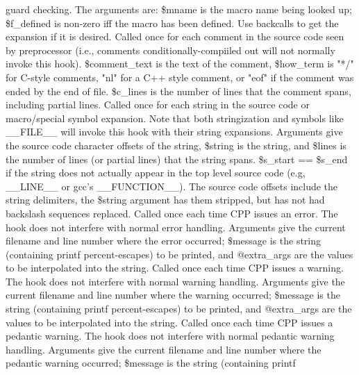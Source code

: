 guard checking.  The arguments are:
\$mname is the macro name being looked up; \$f\_\-defined is non-zero
iff the macro has been defined.  Use backcalls to get the expansion if
it is desired.
Called once for each comment in the source code seen by preprocessor (i.e.,
comments conditionally-compiiled out will not normally invoke this hook).
\$comment\_\-text is the text of the comment, \$how\_\-term is "*/" for C-style
comments, "nl" for a C++ style comment, or "eof" if the comment
was ended by the end of file.
\$c\_\-lines is the number of lines that the comment spans, including partial lines.
Called once for each string in the source code or macro/special symbol expansion.
Note that both stringization and symbols like \_\-\_\-FILE\_\-\_\- will invoke this hook
with their string expansions.
Arguments give the source code character offsets of the string, \$string is
the string, and \$lines is the number of lines (or partial lines) that the
string spans.  \$s\_\-start == \$s\_\-end if the string does not actually appear
in the top level source code (e.g, \_\-\_\-LINE\_\-\_\- or gcc's \_\-\_\-FUNCTION\_\-\_\-).
The source code offsets include the string delimiters, the \$string argument
has them stripped, but has not had backslash sequences replaced.
Called once each time CPP issues an error.  The hook does not interfere
with normal error handling.  Arguments give the current filename and line
number where the error occurred;  \$message is the string (containing printf
percent-escapes) to be printed, and @extra\_\-args are the values to be 
interpolated into the string.
Called once each time CPP issues a warning.  The hook does not interfere
with normal warning handling.  Arguments give the current filename and line
number where the warning occurred;  \$message is the string (containing printf
percent-escapes) to be printed, and @extra\_\-args are the values to be 
interpolated into the string.
Called once each time CPP issues a pedantic warning.  The hook does not interfere
with normal pedantic warning handling.  Arguments give the current filename and line
number where the pedantic warning occurred;  \$message is the string (containing printf
